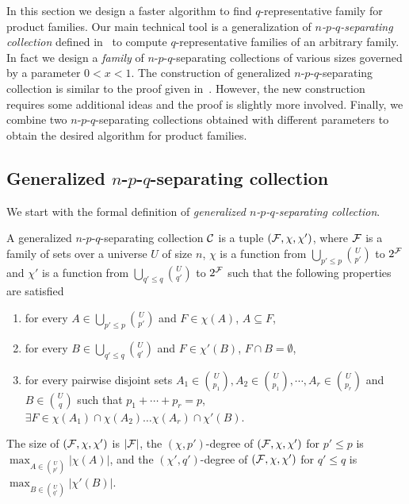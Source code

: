 



In this section we design a faster algorithm to find $q$-representative family for product families. Our main technical tool is a generalization of {\em $n$-$p$-$q$-separating collection} defined in~\cite{FominLS13} to compute  $q$-representative families of an arbitrary family. In fact we design a {\em family} of $n$-$p$-$q$-separating collections of various sizes governed by a parameter $0<x<1$.  The construction of generalized $n$-$p$-$q$-separating collection  is similar to the proof given in~\cite{FominLS13}. However, the new construction  requires some additional ideas and the proof is slightly more involved. Finally, we combine two $n$-$p$-$q$-separating collections obtained with different parameters to obtain the desired algorithm for product families. 

\subsection{Generalized $n$-$p$-$q$-separating collection}

We start with the formal definition of {\em generalized $n$-$p$-$q$-separating collection}.

\begin{definition}
\label{def:twincollection}
A generalized $n$-$p$-$q$-separating collection ${\cal C}$ is a tuple $({\cal F}, \chi, \chi')$, where ${\cal F}$ is a family of sets over a universe $U$ of size $n$, $\chi$ is a function from 
$\bigcup_{p'\leq p}{U\choose p'}$ to $2^{\cal F}$ and $\chi'$ is a function from $\bigcup_{q'\leq q}{U\choose q'}$ to $2^{\cal F}$ such that the following properties are satisfied
\begin{enumerate}
 \item for every $A\in \bigcup_{p'\leq p}{U\choose p'}$ and $F \in \chi(A)$, $A \subseteq F$,
 \item for every $B\in \bigcup_{q'\leq q}{U\choose q'}$ and $F \in \chi'(B)$, $F\cap B=\emptyset$, 
 \item for every pairwise disjoint sets $A_1\in {U \choose p_1},A_2\in {U \choose p_1},\cdots, A_r\in {U \choose p_r}$ and $B \in {U \choose q}$ such that $p_1+\cdots+p_r=p$, 
$\exists F\in \chi(A_1)\cap\chi(A_2)\ldots\chi(A_r)\cap \chi'(B)$.
\end{enumerate}
The size of  $({\cal F},\chi, \chi')$ is $|{\cal F}|$, the $(\chi,p')$-degree of $({\cal F},\chi,\chi')$ for $p'\leq p$ is $\max_{A \in {U \choose p'}} |\chi(A)|$, 
and the $(\chi',q')$-degree of $({\cal F},\chi, \chi')$ for $q'\leq q$ is $\max_{B \in {U \choose q'}} |\chi'(B)|$. 
\end{definition}




